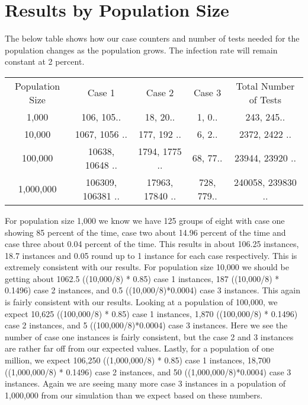 \documentclass{article}
\begin{document}
\section{Results by Population Size}
\large
The below table shows how our case counters and number of tests needed for the population changes as the population grows. The infection rate will remain constant at 2 percent. 

\begin{center}
\begin{tabular}{ c c c c c}
 Population Size  & Case 1  & Case 2 & Case 3 & Total Number of Tests \\ 
 1,000 & 106, 105..  &  18, 20.. & 1, 0.. & 243, 245.. \\ 
 10,000 & 1067, 1056 ..  &  177, 192 .. & 6, 2.. & 2372, 2422 .. \\ 
 100,000 & 10638, 10648 ..  &  1794, 1775 .. & 68, 77.. & 23944, 23920 .. \\ 1,000,000 & 106309, 106381 ..  &  17963, 17840 .. & 728, 779.. & 240058, 239830 .. \\
\end{tabular}
\end{center}
For population size 1,000 we know we have 125 groups of eight with case one showing 85 percent of the time, case two about 14.96 percent of the time and case three about 0.04 percent of the time. This results in about 106.25 instances, 18.7 instances and 0.05 round up to 1 instance for each case respectively. This is extremely consistent with our results. For population size 10,000 we should be getting about 1062.5 ((10,000/8) * 0.85) case 1 instances, 187 ((10,000/8) * 0.1496) case 2 instances, and 0.5 ((10,000/8)*0.0004) case 3 instances. This again is fairly consistent with our results. Looking at a population of 100,000, we expect 10,625 ((100,000/8) * 0.85) case 1 instances, 1,870 ((100,000/8) * 0.1496) case 2 instances, and 5 ((100,000/8)*0.0004) case 3 instances. Here we see the number of case one instances is fairly consistent, but the case 2 and 3 instances are rather far off from our expected values. Lastly, for a population of one million, we expect 106,250 ((1,000,000/8) * 0.85) case 1 instances, 18,700 ((1,000,000/8) * 0.1496) case 2 instances, and 50 ((1,000,000/8)*0.0004) case 3 instances. Again we are seeing many more case 3 instances in a population of 1,000,000 from our simulation than we expect based on these numbers. 
\end{document}
